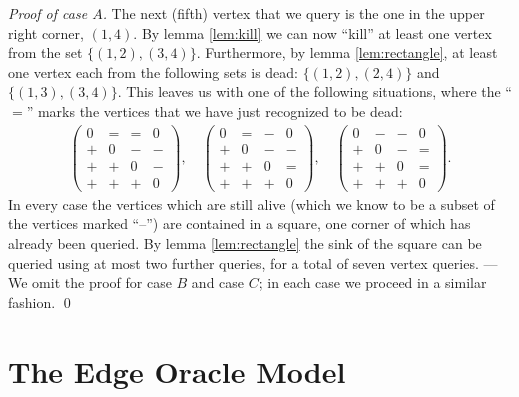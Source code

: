 \documentclass[runningheads,a4paper]{llncs}
\begin{document}
\begin{proof}[Proof of case $A$]
    The next (fifth) vertex that we query is the one in the upper right
    corner, $(1,4)$.
    By lemma \ref{lem:kill} we can now ``kill'' at least one vertex from
    the set $\{ (1,2), (3,4) \}$.
    Furthermore, by lemma \ref{lem:rectangle}, at least one vertex each from
    the following sets is dead: $\{ (1,2), (2,4) \}$
    and $\{ (1,3), (3,4) \}$.
    This leaves us with one of the following situations, where the ``$=$''
    marks the vertices that we have just recognized to be dead:
    \begin{align*}
        \begin{pmatrix}
            0 & = & = & 0
            \\
            + & 0 & - & -
            \\
            + & + & 0 & -
            \\
            + & + & + & 0
        \end{pmatrix},
        \quad
        \begin{pmatrix}
            0 & = & - & 0
            \\
            + & 0 & - & -
            \\
            + & + & 0 & =
            \\
            + & + & + & 0
        \end{pmatrix},
        \quad
        \begin{pmatrix}
            0 & - & - & 0
            \\
            + & 0 & - & =
            \\
            + & + & 0 & =
            \\
            + & + & + & 0
        \end{pmatrix}.
    \end{align*}
    In every case the vertices which are still alive (which we know to be a
    subset of the vertices marked ``--'') are contained in a
    square, one corner of which has already been queried.
    By lemma \ref{lem:rectangle} the sink of the square can be queried using
    at most two further queries, for a total of seven vertex queries.
    ---
    We omit the proof for case $B$ and case $C$; in each case we proceed in a
    similar fashion. \qed
\end{proof}

\section{The Edge Oracle Model}
\label{section:The edge oracle model}
\end{document}
